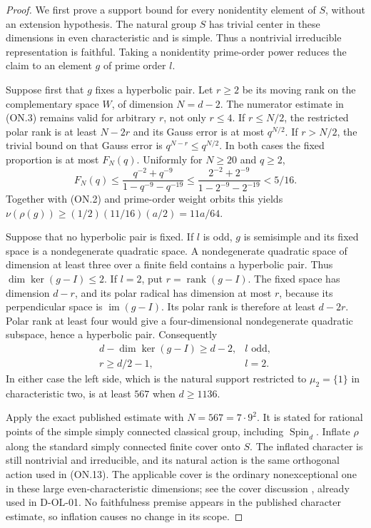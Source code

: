 \begin{proof}
We first prove a support bound for every nonidentity element of
$S$, without an extension hypothesis.  The natural group $S$ has
trivial center in these dimensions in even characteristic and is
simple.  Thus a nontrivial irreducible representation is faithful.
Taking a nonidentity prime-order power reduces the claim to an
element $g$ of prime order $l$.

Suppose first that $g$ fixes a hyperbolic pair.  Let $r\ge2$ be
its moving rank on the complementary space $W$, of dimension
$N=d-2$.  The numerator estimate in (ON.3) remains valid for
arbitrary $r$, not only $r\le4$.  If $r\le N/2$, the restricted
polar rank is at least $N-2r$ and its Gauss error is at most
$q^{N/2}$.  If $r>N/2$, the trivial bound on that Gauss error
is $q^{N-r}\le q^{N/2}$.  In both cases the fixed proportion
is at most $F_N(q)$.  Uniformly for $N\ge20$ and $q\ge2$,
\[
 F_N(q)\le\frac{q^{-2}+q^{-9}}{1-q^{-9}-q^{-19}}
 \le\frac{2^{-2}+2^{-9}}{1-2^{-9}-2^{-19}}<5/16.             \tag{ON.12}
\]
Together with (ON.2) and prime-order weight orbits this yields
$\nu(\rho(g))\ge(1/2)(11/16)(a/2)=11a/64$.

Suppose that no hyperbolic pair is fixed.  If $l$ is odd, $g$
is semisimple and its fixed space is a nondegenerate quadratic
space.  A nondegenerate quadratic space of dimension at least
three over a finite field contains a hyperbolic pair.  Thus
$\dim\ker(g-I)\le2$.
If $l=2$, put $r=\operatorname{rank}(g-I)$.  The fixed space
has dimension $d-r$, and its polar radical has dimension at most
$r$, because its perpendicular space is $\operatorname{im}(g-I)$.
Its polar rank is therefore at least $d-2r$.  Polar rank at least
four would give a four-dimensional nondegenerate quadratic
subspace, hence a hyperbolic pair.  Consequently
\[
 \begin{array}{ll}
 d-\dim\ker(g-I)\ge d-2, & l\text{ odd},\\
 r\ge d/2-1,             & l=2.
 \end{array}                                                   \tag{ON.13}
\]
In either case the left side, which is the natural support
restricted to $\mu_2=\{1\}$ in characteristic two, is at least
$567$ when $d\ge1136$.

Apply the exact published estimate
\cite[Theorem~4.3.6, (4.3.2), pp.~1917--1918; complete proof
pp.~1918--1923; Remark~4.3.7, p.~1923]{HOS:LST2011} with
$N=567=7\cdot9^2$.  It is stated for rational points of the
simple simply connected classical group, including
$\operatorname{Spin}_d$.  Inflate $\rho$ along the standard
simply connected finite cover onto $S$.  The inflated character
is still nontrivial and irreducible, and its natural action is
the same orthogonal action used in (ON.13).  The applicable
cover is the ordinary nonexceptional one in these large
even-characteristic dimensions; see the cover discussion
\cite[p.~4; Chapter~5, Table~1, p.~35]{BI:HHM}, already used in
D-OL-01.  No faithfulness premise appears in the published
character estimate, so inflation causes no change in its scope.


\end{proof}
